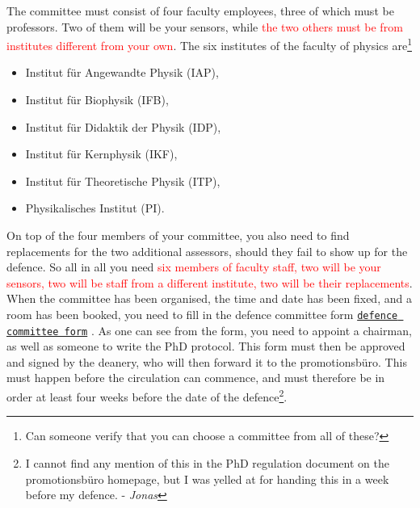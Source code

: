 \documentclass[a4paper]{article}
\newcommand{\attention}[1]{\textcolor{red}{#1}}
\newcommand{\file}[2][]{%
    \ifthenelse{\isempty{#1}}%
        {\textcolor{fileColor}{#2}}%
        {\href{run:#1}{\texttt{\textcolor{fileColor}{#2}}}}%
}
\begin{document}
        The committee must consist of four faculty employees, three of which must be professors.
        Two of them will be your sensors, while \attention{the two others must be from institutes different from your own}.
        The six institutes of the faculty of physics are\footnote{Can someone verify that you can choose a committee from all of these?}
        \begin{multicols}{2}
          \begin{itemize}
            \item Institut f\"ur Angewandte Physik (IAP),
            \item Institut f\"ur Biophysik (IFB),
            \item Institut f\"ur Didaktik der Physik (IDP),
            \item Institut f\"ur Kernphysik (IKF),
            \item Institut f\"ur Theoretische Physik (ITP),
            \item Physikalisches Institut (PI).
          \end{itemize}
        \end{multicols}
        On top of the four members of your committee, you also need to find replacements for the two additional assessors, should they fail to show up for the defence.
        So all in all you need \attention{six members of faculty staff, two will be your sensors, two will be staff from a different institute, two will be their replacements}.
        When the committee has been organised, the time and date has been fixed, and a room has been booked, you need to fill in the \file[Prufungskommission.pdf]{defence committee form}.
        As one can see from the form, you need to appoint a chairman, as well as someone to write the PhD protocol.
        This form must then be approved and signed by the deanery, who will then forward it to the promotionsb\"uro.
        This must happen before the circulation can commence, and must therefore be in order at least four weeks before the date of the defence\footnote{I cannot find any mention of this in the PhD regulation document on the promotionsb\"uro homepage, but I was yelled at for handing this in a week before my defence. - \emph{Jonas}}.
    
\end{document}
